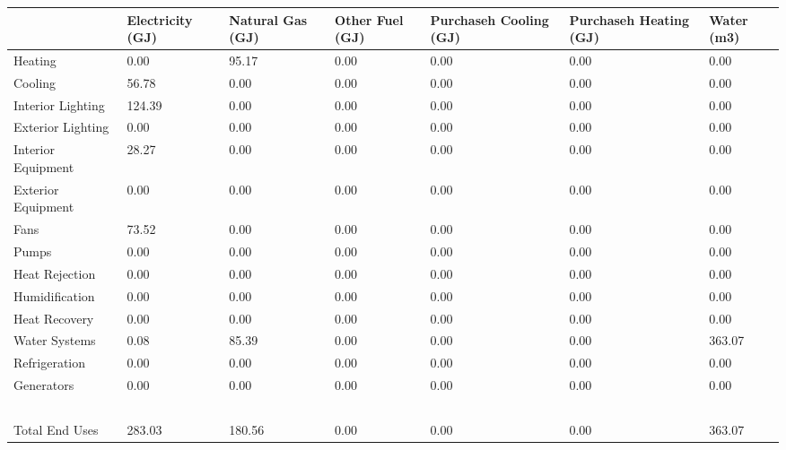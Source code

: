 \begin{longtable}[c]{p{0.85in}p{0.85in}p{0.85in}p{0.85in}p{0.85in}p{0.85in}p{0.85in}}
\toprule 
~ & Electricity (GJ) & Natural Gas (GJ) & Other Fuel (GJ) & Purchaseh Cooling (GJ) & Purchaseh Heating (GJ) & Water (m3) \tabularnewline \midrule
\endhead
Heating & 0.00 & 95.17 & 0.00 & 0.00 & 0.00 & 0.00 \tabularnewline
Cooling & 56.78 & 0.00 & 0.00 & 0.00 & 0.00 & 0.00 \tabularnewline
Interior Lighting & 124.39 & 0.00 & 0.00 & 0.00 & 0.00 & 0.00 \tabularnewline
Exterior Lighting & 0.00 & 0.00 & 0.00 & 0.00 & 0.00 & 0.00 \tabularnewline
Interior Equipment & 28.27 & 0.00 & 0.00 & 0.00 & 0.00 & 0.00 \tabularnewline
Exterior Equipment & 0.00 & 0.00 & 0.00 & 0.00 & 0.00 & 0.00 \tabularnewline
Fans & 73.52 & 0.00 & 0.00 & 0.00 & 0.00 & 0.00 \tabularnewline
Pumps & 0.00 & 0.00 & 0.00 & 0.00 & 0.00 & 0.00 \tabularnewline
Heat Rejection & 0.00 & 0.00 & 0.00 & 0.00 & 0.00 & 0.00 \tabularnewline
Humidification & 0.00 & 0.00 & 0.00 & 0.00 & 0.00 & 0.00 \tabularnewline
Heat Recovery & 0.00 & 0.00 & 0.00 & 0.00 & 0.00 & 0.00 \tabularnewline
Water Systems & 0.08 & 85.39 & 0.00 & 0.00 & 0.00 & 363.07 \tabularnewline
Refrigeration & 0.00 & 0.00 & 0.00 & 0.00 & 0.00 & 0.00 \tabularnewline
Generators & 0.00 & 0.00 & 0.00 & 0.00 & 0.00 & 0.00 \tabularnewline
~ & ~ & ~ & ~ & ~ & ~ & ~ \tabularnewline
Total End Uses & 283.03 & 180.56 & 0.00 & 0.00 & 0.00 & 363.07 \tabularnewline
\bottomrule
\end{longtable}
